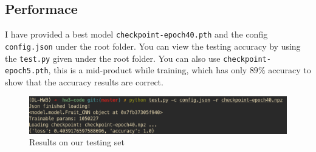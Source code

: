 \documentclass[a4paper, 10]{article}
\begin{document}
    \subsection{Performace}
        I have provided a best model \verb|checkpoint-epoch40.pth| and the config 
        \verb|config.json| under the root folder. You can view  the testing accuracy 
        by using the \verb|test.py| given under the root folder. You can also 
        use \verb|checkpoint-epoch5.pth|, this is a mid-product while 
        training, which has only $89\%$ accuracy to show that the accuracy 
        results are correct.
        \begin{figure}[H]
            \centering
            \includegraphics [scale=0.3]{Screenshot_20220111_143520.png}
            \caption{Results on our testing set}
        \end{figure}
\end{document}
